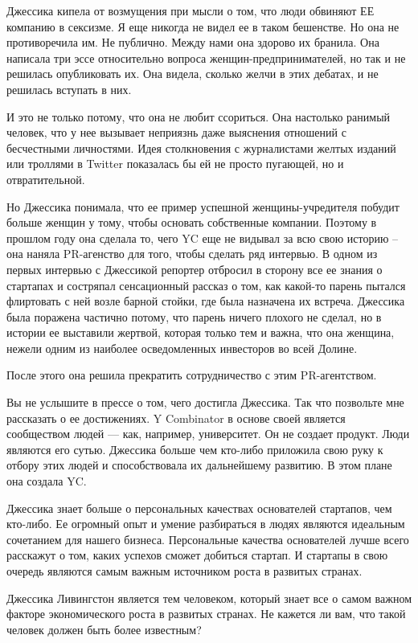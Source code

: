 \documentclass[ebook,12pt,oneside,openany]{memoir}
\begin{document}
Джессика кипела от возмущения при мысли о том, что люди обвиняют ЕЕ
компанию в сексизме. Я еще никогда не видел ее в таком бешенстве. Но
она не противоречила им. Не публично. Между нами она здорово их
бранила. Она написала три эссе относительно вопроса
женщин-предпринимателей, но так и не решилась опубликовать их. Она
видела, сколько желчи в этих дебатах, и не решилась вступать в них.

И это не только потому, что она не любит ссориться. Она настолько
ранимый человек, что у нее вызывает неприязнь даже выяснения отношений
с бесчестными личностями. Идея столкновения с журналистами желтых
изданий или троллями в Twitter показалась бы ей не просто пугающей, но
и отвратительной.

Но Джессика понимала, что ее пример успешной женщины-учредителя
побудит больше женщин у тому, чтобы основать собственные компании.
Поэтому в прошлом году она сделала то, чего YC еще не видывал за всю
свою историю – она наняла PR-агенство для того, чтобы сделать ряд
интервью. В одном из первых интервью с Джессикой репортер отбросил в
сторону все ее знания о стартапах и состряпал сенсационный рассказ о
том, как какой-то парень пытался флиртовать с ней возле барной стойки,
где была назначена их встреча. Джессика была поражена частично потому,
что парень ничего плохого не сделал, но в истории ее выставили
жертвой, которая только тем и важна, что она женщина, нежели одним из
наиболее осведомленных инвесторов во всей Долине.

После этого она решила прекратить сотрудничество с этим PR-агентством.

Вы не услышите в прессе о том, чего достигла Джессика. Так что
позвольте мне рассказать о ее достижениях. Y Combinator в основе своей
является сообществом людей — как, например, университет. Он не создает
продукт. Люди являются его сутью. Джессика больше чем кто-либо
приложила свою руку к отбору этих людей и способствовала их
дальнейшему развитию. В этом плане она создала YC.

Джессика знает больше о персональных качествах основателей стартапов,
чем кто-либо. Ее огромный опыт и умение разбираться в людях являются
идеальным сочетанием для нашего бизнеса. Персональные качества
основателей лучше всего расскажут о том, каких успехов сможет добиться
стартап. И стартапы в свою очередь являются самым важным источником
роста в развитых странах.

Джессика Ливингстон является тем человеком, который знает все о самом
важном факторе экономического роста в развитых странах. Не кажется ли
вам, что такой человек должен быть более известным?
\end{document}
